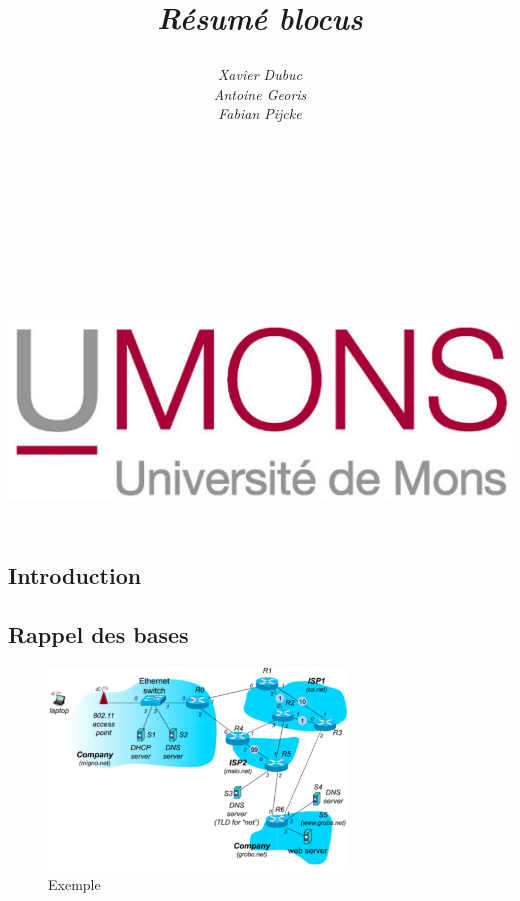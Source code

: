 \documentclass{article}
\title{$ $\\ $ $\\ $ $\\ $ $\\ $ $\\ $ $\\ $ $\\\begin{Huge}\maintitlecolor{Réseaux II}\end{Huge} \\ 
   $ $ \\ \begin{LARGE}\textit{Résumé blocus}\end{LARGE}}
\author{\textit{Xavier Dubuc} \\ 
		\textit{Antoine Georis} \\
		\textit{Fabian Pijcke} \\$ $ \\$ $ \\$ $\\ $ $\\ $ $\\ $ $\\ $ $\\ $ $\\ $ $\\ $ 
$ \\ 
\includegraphics{UMONS.jpg}}
\begin{document}
\begin{sffamily}

\maketitle

\newpage

\tableofcontents

\hbox{}

\newpage

\section{Introduction}

\subsection{Rappel des bases}

\begin{figure}[h!]
    \begin{center}
    \includegraphics[width=300px]{img_001.pdf}
    \caption{Exemple}
    \end{center}	
\end{figure}


\end{sffamily}
\end{document}
